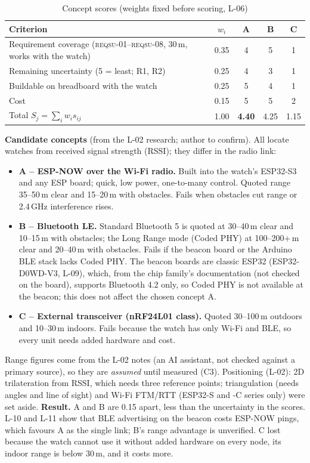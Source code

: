 \IfFileExists{IEEEtran.cls}{\documentclass[conference]{IEEEtran}}{\documentclass[10pt,twocolumn]{article}}
\newcommand{\req}[1]{\textsc{reqsu-}#1}
\begin{document}
\begin{table}[!t]
\caption{Concept scores (weights fixed before scoring, L-06)}
\centering\footnotesize
\begin{tabularx}{\columnwidth}{@{}Y c c c c@{}}
\toprule
Criterion & $w_i$ & A & B & C\\
\midrule
Requirement coverage (\req{01}--\req{08}, 30\,m, works with the watch) & 0.35 & 4 & 5 & 1\\
Remaining uncertainty (5 = least; R1, R2) & 0.25 & 4 & 3 & 1\\
Buildable on breadboard with the watch & 0.25 & 5 & 4 & 1\\
Cost & 0.15 & 5 & 5 & 2\\
\midrule
Total $S_j=\sum_i w_i s_{ij}$ & 1.00 & \textbf{4.40} & 4.25 & 1.15\\
\bottomrule
\end{tabularx}
\end{table}

\textbf{Candidate concepts} (from the L-02 research; author to confirm). All locate watches from received signal strength (RSSI); they differ in the radio link:
\begin{itemize}\setlength\itemsep{0pt}
\item \textbf{A -- ESP-NOW over the Wi-Fi radio.} Built into the watch's ESP32-S3 and any ESP board; quick, low power, one-to-many control. Quoted range 35--50\,m clear and 15--20\,m with obstacles. Fails when obstacles cut range or 2.4\,GHz interference rises.
\item \textbf{B -- Bluetooth LE.} Standard Bluetooth 5 is quoted at 30--40\,m clear and 10--15\,m with obstacles; the Long Range mode (Coded PHY) at 100--200+\,m clear and 20--40\,m with obstacles. Fails if the beacon board or the Arduino BLE stack lacks Coded PHY. The beacon boards are classic ESP32 (ESP32-D0WD-V3, L-09), which, from the chip family's documentation (not checked on the board), supports Bluetooth 4.2 only, so Coded PHY is not available at the beacon; this does not affect the chosen concept A.
\item \textbf{C -- External transceiver (nRF24L01 class).} Quoted 30--100\,m outdoors and 10--30\,m indoors. Fails because the watch has only Wi-Fi and BLE, so every unit needs added hardware and cost.
\end{itemize}
Range figures come from the L-02 notes (an AI assistant, not checked against a primary source), so they are \emph{assumed} until measured (C3). Positioning (L-02): 2D trilateration from RSSI, which needs three reference points; triangulation (needs angles and line of sight) and Wi-Fi FTM/RTT (ESP32-S and -C series only) were set aside. \textbf{Result.} A and B are 0.15 apart, less than the uncertainty in the scores. L-10 and L-11 show that BLE advertising on the beacon costs ESP-NOW pings, which favours A as the single link; B's range advantage is unverified. C lost because the watch cannot use it without added hardware on every node, its indoor range is below 30\,m, and it costs more.
\end{document}
